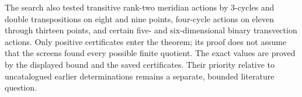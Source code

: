\documentclass[11pt]{amsart}
\theoremstyle{remark}
\begin{document}
The search also tested transitive rank-two meridian actions by $3$-cycles and double transpositions on eight and nine points, four-cycle actions on eleven through thirteen points, and certain five- and six-dimensional binary transvection actions. Only positive certificates enter the theorem; its proof does not assume that the screens found every possible finite quotient. The exact values are proved by the displayed bound and the saved certificates. Their priority relative to uncatalogued earlier determinations remains a separate, bounded literature question.



\end{document}
